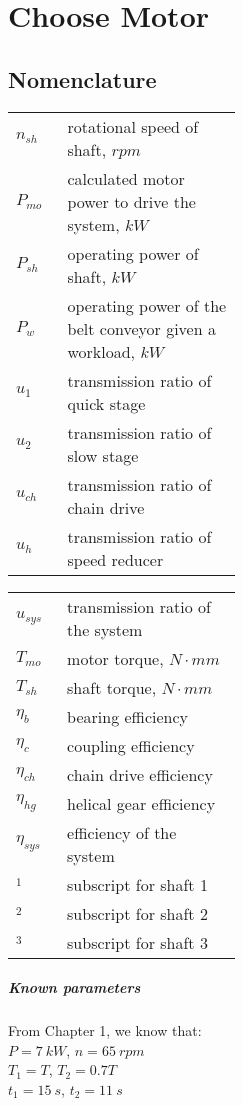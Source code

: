 \chapter{Choose Motor}

\section*{Nomenclature}
\begin{tabular}[t]{p{0.05\linewidth}p{0.4\linewidth}}
	$ n_{sh} $ & rotational speed of shaft, $ \unit{rpm} $\\
	$ P_{mo} $ & calculated motor power to drive the system, $ \unit{kW} $\\
	$ P_{sh} $ & operating power of shaft, $ \unit{kW} $\\
	$ P_w $ & operating power of the belt conveyor given a workload, $ \unit{kW} $\\
	$ u_1 $ & transmission ratio of quick stage\\
	$ u_2 $ & transmission ratio of slow stage\\
	$ u_{ch} $ & transmission ratio of chain drive\\
	$ u_{h} $ & transmission ratio of speed reducer
\end{tabular}
\begin{tabular}[t]{p{0.05\linewidth}p{0.4\linewidth}}
	$ u_{sys} $ & transmission ratio of the system\\
	$ T_{mo} $ & motor torque, $ \unit{N\cdot mm} $\\
	$ T_{sh} $ & shaft torque, $ \unit{N\cdot mm} $\\
	$ \eta_b $ & bearing efficiency\\
	$ \eta_c $ & coupling efficiency\\
	$ \eta_{ch} $ & chain drive efficiency\\
	$ \eta_{hg} $ & helical gear efficiency\\
	$ \eta_{sys} $ & efficiency of the system\\
	$ _1 $ & subscript for shaft 1\\
	$ _2 $ & subscript for shaft 2\\
	$ _3 $ & subscript for shaft 3
\end{tabular}
\paragraph{Known parameters} From Chapter 1, we know that:\\
$ P=\SI{7}{kW}$, $n=\SI{65}{rpm} $\\
$ T_1=T$, $T_2=0.7T$\\
$ t_1=\SI{15}{s}$, $t_2=\SI{11}{s} $
